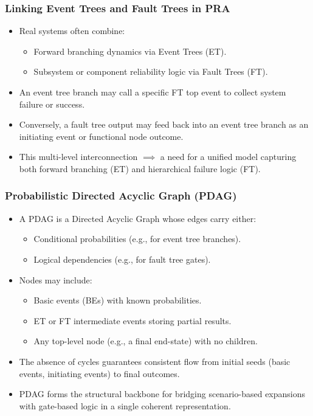 \begin{frame}[t, allowframebreaks]
\frametitle{Linking Event Trees and Fault Trees in PRA}
\begin{itemize}
  \item Real systems often combine:
    \begin{itemize}
      \item Forward branching dynamics via Event Trees (ET).
      \item Subsystem or component reliability logic via Fault Trees (FT).
    \end{itemize}
  \item An event tree branch may call a specific FT top event to collect system failure or success.
  \item Conversely, a fault tree output may feed back into an event tree branch as an initiating event or functional node outcome.
  \item This multi-level interconnection \(\implies\) a need for a unified model capturing both forward branching (ET) and hierarchical failure logic (FT).
\end{itemize}
\end{frame}

\begin{frame}[t, allowframebreaks]
\frametitle{Probabilistic Directed Acyclic Graph (PDAG)}
\begin{itemize}
  \item A PDAG is a Directed Acyclic Graph whose edges carry either:
    \begin{itemize}
      \item Conditional probabilities (e.g., for event tree branches).  
      \item Logical dependencies (e.g., for fault tree gates).
    \end{itemize}
  \item Nodes may include:
    \begin{itemize}
      \item Basic events (BEs) with known probabilities.
      \item ET or FT intermediate events storing partial results.
      \item Any top-level node (e.g., a final end-state) with no children.
    \end{itemize}
  \item The absence of cycles guarantees consistent flow from initial seeds (basic events, initiating events) to final outcomes.
  \item PDAG forms the structural backbone for bridging scenario-based expansions with gate-based logic in a single coherent representation.
\end{itemize}
\end{frame}

